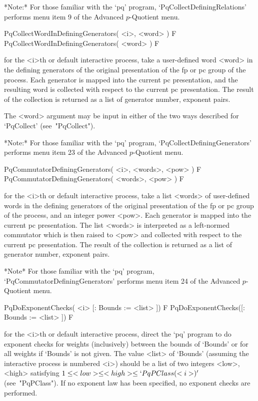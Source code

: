 *Note:*
For those familiar with  the  `pq'  program,  `PqCollectDefiningRelations'
performs menu item 9 of the Advanced $p$-Quotient menu.

\>PqCollectWordInDefiningGenerators( <i>, <word> ) F
\>PqCollectWordInDefiningGenerators( <word> ) F

for  the   <i>th  or  default  interactive  {\ANUPQ}   process,  take   a
user-defined word <word> in  the  defining  generators  of  the  original
presentation of the fp or pc group of  the  process.  Each  generator  is
mapped into the current  pc  presentation,  and  the  resulting  word  is
collected with respect to the current pc presentation. The result of  the
collection is returned as a list of generator number, exponent pairs.

The <word> argument may be input  in either of the two ways described for
`PqCollect' (see~"PqCollect").

*Note:*
For those familiar with the  `pq'  program,  `PqCollectDefiningGenerators'
performs menu item 23 of the Advanced $p$-Quotient menu.

\>PqCommutatorDefiningGenerators( <i>, <words>, <pow> ) F
\>PqCommutatorDefiningGenerators( <words>, <pow> ) F

for the <i>th or  default  interactive  {\ANUPQ}  process,  take  a  list
<words> of user-defined words in the defining generators of the  original
presentation of the fp or pc group of the process, and an  integer  power
<pow>. Each generator is mapped into the  current  pc  presentation.  The
list <words> is interpreted as a left-normed  commutator  which  is  then
raised  to  <pow>  and  collected  with  respect  to   the   current   pc
presentation. The result of the collection  is  returned  as  a  list  of
generator number, exponent pairs.

\goodbreak%
*Note*
For those familiar with the `pq' program, `PqCommutatorDefiningGenerators'
performs menu item 24 of the Advanced $p$-Quotient menu.

\>PqDoExponentChecks( <i> [: Bounds := <list> ]) F
\>PqDoExponentChecks([: Bounds := <list> ]) F

for the  <i>th or  default interactive {\ANUPQ}  process, direct  the `pq'
program to do exponent checks for weights (inclusively) between the bounds
of `Bounds' or for all weights  if `Bounds' is not given. The value <list>
of `Bounds' (assuming the interactive process is numbered <i>) should be a
list of two integers <low>, <high>  satisfying $1 \le <low> \le <high> \le
`PqPClass(<i>)'$ (see~"PqPClass").  If no exponent law has been specified,
no exponent checks are performed.


